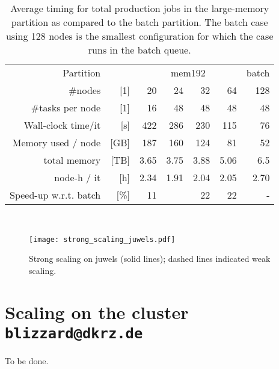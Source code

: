 \begin{table}
  \caption{Average timing for total production jobs in the large-memory partition as compared to the batch partition.
  The batch case using 128 nodes is the smallest configuration for which the case runs in the batch queue. }
  \begin{centering}{\footnotesize\begin{tabular}{rrr|r|rrr}
    \toprule
    Partition               && \multicolumn{4}{c}{mem192}&batch\\
    \#nodes                 &[1]&    20  &  24  &  32 &  64 & 128\\
    \midrule 
    \rowcolor{gray!20}\#tasks per node        &[1]&    16  &  48  &  48 &  48 &  48\\
    Wall-clock time/it &[s]      &    422 &  286 & 230 & 115 & 76 \\ 
    \rowcolor{gray!20} Memory used / node& [GB] &    187 &  160 & 124 &  81 & 52 \\
    total memory & [TB]       &    3.65&  3.75& 3.88& 5.06& 6.5\\
    \rowcolor{gray!20}node-h / it & [h]             &    2.34& 1.91 & 2.04& 2.05& 2.70\\
    \midrule
    Speed-up w.r.t. batch & $[$\%$]$  &    11& \cellcolor{green!62}{\textbf{31}}&22&22&  -\\
    \midrule\bottomrule
   
  \end{tabular}}\\\end{centering}
  \label{tab:memory_juwels} 
\end{table} 


\begin{figure}
  \centering\texttt{[image: strong\_scaling\_juwels.pdf]}
  \caption{Strong scaling on juwels (solid lines); dashed lines indicated weak scaling.}
  \label{fig:scaling_juwels}
\end{figure} 

\section{Scaling on the cluster \texttt{blizzard@dkrz.de}}

To be done.  


